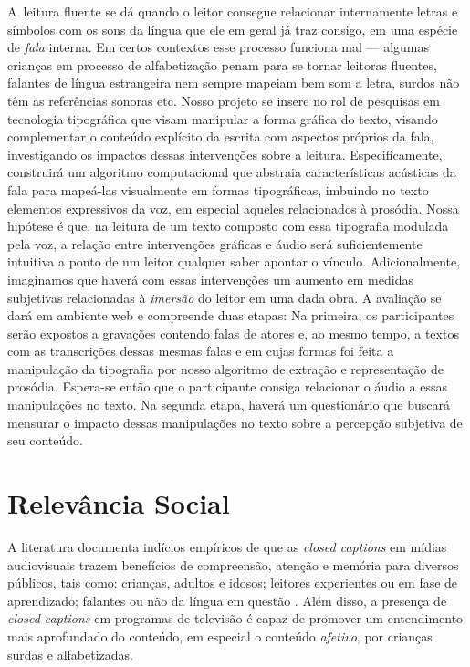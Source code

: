 \documentclass[a4paper,11pt,titlepage,singlespacing]{article}
\begin{document}
\newpage

\abstract

\noindent A~leitura fluente se dá quando o leitor consegue relacionar internamente letras e símbolos com os sons da língua que ele em geral já traz consigo, em uma espécie de \textit{fala} interna. Em certos contextos esse processo funciona mal — algumas crianças em processo de alfabetização penam para se tornar leitoras fluentes, falantes de língua estrangeira nem sempre mapeiam bem som a letra, surdos não têm as referências sonoras etc. Nosso projeto se insere no rol de pesquisas em tecnologia tipográfica que visam manipular a forma gráfica do texto, visando complementar o conteúdo explícito da escrita com aspectos próprios da fala, investigando os impactos dessas intervenções sobre a leitura. Especificamente, construirá um algoritmo computacional que abstraia características acústicas da fala para mapeá-las visualmente em formas tipográficas, imbuindo no texto elementos expressivos da voz, em especial aqueles relacionados à prosódia. Nossa hipótese é que, na leitura de um texto composto com essa tipografia modulada pela voz, a relação entre intervenções gráficas e áudio será suficientemente intuitiva a ponto de um leitor qualquer saber apontar o vínculo. Adicionalmente, imaginamos que haverá com essas intervenções um aumento em medidas subjetivas relacionadas à \textit{imersão} do leitor em uma dada obra. A avaliação se dará em ambiente web e compreende duas etapas: Na primeira, os participantes serão expostos a gravações contendo falas de atores e, ao mesmo tempo, a textos com as transcrições dessas mesmas falas e em cujas formas foi feita a manipulação da tipografia por nosso algoritmo de extração e representação de prosódia. Espera-se então que o participante consiga relacionar o áudio a essas manipulações no texto. Na segunda etapa, haverá um questionário que buscará mensurar o impacto dessas manipulações no texto sobre a percepção subjetiva de seu conteúdo.

\newpage


\thispagestyle{empty}
\newpage


\newpage

\section*{Relevância Social}

\noindent A literatura documenta indícios empíricos de que as \emph{closed captions} em mídias audiovisuais trazem benefícios de compreensão, atenção e memória para diversos públicos, tais como: crianças, adultos e idosos; leitores experientes ou em fase de aprendizado; falantes ou não da língua em questão \cite{fiske_video_2015}. Além disso, a presença de \emph{closed captions} em programas de televisão é capaz de promover um entendimento mais aprofundado do conteúdo, em especial o conteúdo \emph{afetivo}, por crianças surdas e alfabetizadas\cite{murphy-berman_impact_1983}.
\end{document}
